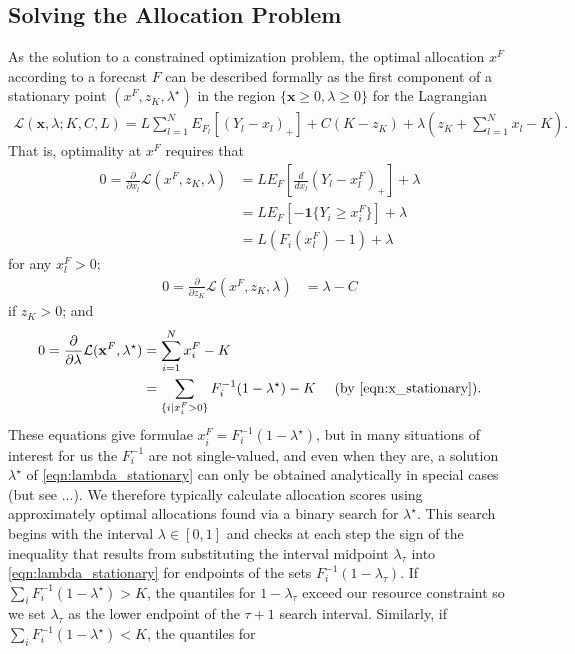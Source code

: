\documentclass{article}
\begin{document}
\subsection{Solving the Allocation Problem}

As the solution to a constrained optimization problem, the optimal allocation $x^F$ according to a forecast $F$ can be described formally as the first component of a stationary point $(x^F, z_K, \lambda^{\star})$ in the region $\{\mathbf{x} \geq 0, \lambda \geq 0\}$ for the Lagrangian 
\begin{align}
\mathcal{L}(\mathbf{x},\lambda; K, C, L) = L\sum_{l=1}^{N} E_{F_l}[(Y_l - x_l)_{+}] + C(K-z_K) + \lambda\left(z_K + \sum_{l=1}^{N} x_l - K\right).
\end{align}
That is, optimality at $x^F$ requires that
\begin{align}
0 = \frac{\partial}{\partial x_l} \mathcal{L}(x^F, z_K, \lambda) &= L E_F \left[\frac{d}{dx_l}(Y_l - x_l^F)_{+}\right] + \lambda \\
& = L E_F \left[-\mathbf{1}\{Y_i \geq x_i^F\}\right] + \lambda \\
& = L(F_i(x_l^F)-1) + \lambda \label{eqn:x_stationary}
\end{align}
for any $x_l^F > 0$;
\begin{align}
0 = \frac{\partial}{\partial z_K} \mathcal{L}(x^F, z_K, \lambda) &= \lambda - C
\end{align}
if $z_K>0$; and
\begin{align}
0 = \frac{\partial {} }{\partial {\lambda}} \mathcal{L}(\mathbf{x}^F, \lambda^{\star}) &= \sum_{i=1}^{N} x_i^F - K\\
& = \sum_{\{i | x_i^F > 0\}} F_{i}^{-1}(1-\lambda^{\star}) - K \quad \text{ (by \eqref{eqn:x_stationary})}. \label{eqn:lambda_stationary}
\end{align}
These equations give formulae $x_i^F = F_i^{-1}(1-\lambda^{\star})$, but in many situations of interest for us the $F_i^{-1}$ are not single-valued, and even 
when they are, a solution $\lambda^{\star}$ of \eqref{eqn:lambda_stationary} can only be obtained analytically in special cases (but see ...). We therefore typically calculate allocation scores using approximately optimal allocations found via a binary search for $\lambda^{\star}$.  This search begins with the interval $\lambda \in [0,1]$ and 
checks at each step the sign of the inequality that results from substituting the interval midpoint $\lambda_{\tau}$ into \eqref{eqn:lambda_stationary} for endpoints of the sets $F_i^{-1}(1-\lambda_{\tau})$.  If $\sum_{i} F_{i}^{-1}(1-\lambda^{\star}) > K$, the quantiles for $1-\lambda_{\tau}$ exceed our resource constraint so we set $\lambda_{\tau}$ as the lower endpoint of the $\tau + 1$ search interval.  Similarly, if $\sum_{i} F_{i}^{-1}(1-\lambda^{\star}) < K$, the quantiles for 
\end{document}
